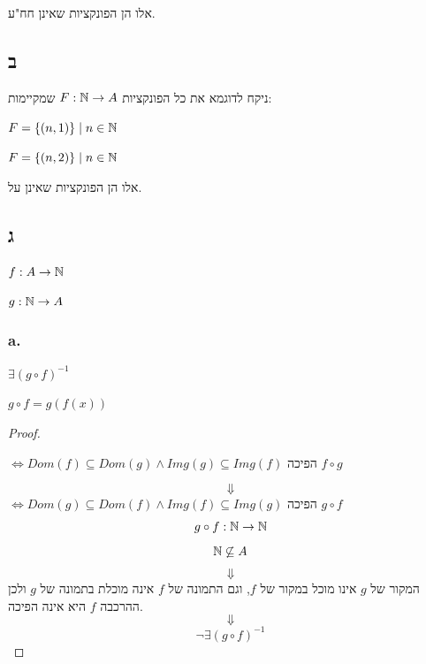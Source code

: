 \documentclass{article}
\begin{document}
אלו הן הפונקציות שאינן חח"ע.

\subsection*{ב}

ניקח לדוגמא את כל הפונקציות
$ F : \Bbb{N} \rightarrow A $
שמקיימות:

\begin{letyehi}
    $ F = \{ (n, 1) \} \; | \; n \in \Bbb{N} $
\end{letyehi}
\begin{letyehi}
    $ F = \{ (n, 2) \} \; | \; n \in \Bbb{N} $
\end{letyehi}

אלו הן הפונקציות שאינן על.

\newpage

\subsection*{ג}

\begin{letyehi}
    $ f : A \rightarrow \Bbb{N} $
\end{letyehi}

\begin{letyehi}
    $ g : \Bbb{N} \rightarrow A $
\end{letyehi}

\subsubsection*{a.}

\begin{ntp}
    $ \exists (g \circ f)^{-1} $
\end{ntp}

\begin{define}
    $ g \circ f = g(f(x)) $
\end{define}

\begin{proof}
    \begin{sen}
        $ \iff Dom(f) \subseteq Dom(g) \land Img(g) \subseteq Img(f) $
        הפיכה $ f \circ g $
    \end{sen}
    \[\Downarrow\]
    $ \iff Dom(g) \subseteq Dom(f) \land Img(f) \subseteq Img(g) $
    הפיכה $ g \circ f $
    \[
        g \circ f: \Bbb{N} \rightarrow \Bbb{N}
    \]
    \[
        \Bbb{N} \not \subseteq A
    \]
    \[\Downarrow\]
    המקור של $g$
    אינו מוכל במקור של $f$,
    וגם התמונה של $f$
    אינה מוכלת בתמונה של $g$
    ולכן ההרכבה $f$
    היא אינה הפיכה.
    \[\Downarrow\]
    \[
        \lnot \exists (g \circ f)^{-1}
    \]    
\end{proof}
\end{document}
